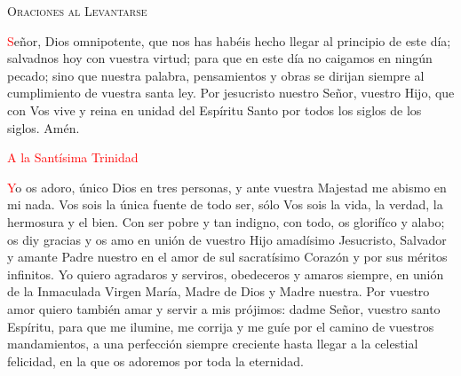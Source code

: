 \documentclass[9pt]{article}
\begin{document}
\begin{center}
      \textsc{\Large{Oraciones al Levantarse}}
\end{center}

\begin{multicols}{2}
      

      \vspace{1mm}

      \textcolor{red}{S}eñor, Dios omnipotente, que nos has habéis hecho llegar al principio de este día; salvadnos hoy con vuestra virtud; para que en este día no caigamos en ningún pecado;
      sino que nuestra palabra, pensamientos y obras se dirijan siempre al cumplimiento de vuestra santa ley. Por jesucristo nuestro Señor, vuestro Hijo, que con Vos vive y reina en unidad
      del Espíritu Santo por todos los siglos de los siglos. Amén.

      \vspace{1mm}

      \begin{otherlanguage}{latin}
            
            
            

            

            

            
      \end{otherlanguage}

      \vspace{1mm}

      \textcolor{red}{A la Santísima Trinidad}

      \textcolor{red}{Y}o os adoro, único Dios en tres personas, y ante vuestra Majestad me abismo en mi nada. Vos sois la única fuente de todo ser, sólo Vos sois la vida, la verdad, la hermosura
      y el bien. Con ser pobre y tan indigno, con todo, os glorifíco y alabo; os diy gracias y os amo en unión de vuestro Hijo amadísimo Jesucristo, Salvador y amante Padre nuestro en el amor de sul
      sacratísimo Corazón y por sus méritos infinitos. Yo quiero agradaros y serviros, obedeceros y amaros siempre, en unión de la Inmaculada Virgen María, Madre de Dios y Madre nuestra.
      Por vuestro amor quiero también amar y servir a mis prójimos: dadme Señor, vuestro santo Espíritu, para que me ilumine, me corrija y me guíe por el camino de vuestros mandamientos, a una
      perfección siempre creciente hasta llegar a la celestial felicidad, en la que os adoremos por toda la eternidad.
      

\end{multicols}
\end{document}
